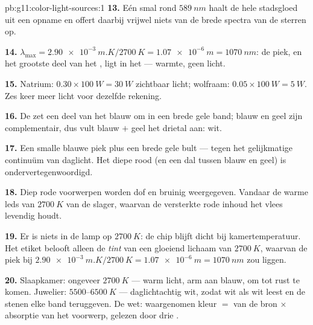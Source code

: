 \begin{solution}{pb:g11:color-light-sources:1}
\textbf{13.} Eén smal  rond $\qty{589}{nm}$ haalt de hele
stadsgloed uit een opname en offert daarbij vrijwel niets van de brede
spectra van de sterren op.

\textbf{14.} $\lambda_{\max} = \qty{2.90e-3}{m.K}/\qty{2700}{K} =
\qty{1.07e-6}{m} = \qty{1070}{nm}$: de piek, en het grootste deel van het
, ligt in het  --- warmte, geen licht.

\textbf{15.} Natrium: $0.30 \times \qty{100}{W} = \qty{30}{W}$ zichtbaar
licht; wolfraam: $0.05 \times \qty{100}{W} = \qty{5}{W}$. Zes keer meer
licht voor dezelfde rekening.

\textbf{16.} De  zet een deel van het blauw om in een brede gele
band; blauw en geel zijn complementair, dus vult blauw $+$ geel het
drietal aan: wit.

\textbf{17.} Een smalle blauwe piek plus een brede gele bult --- tegen
het gelijkmatige continuüm van daglicht. Het diepe rood (en een dal
tussen blauw en geel) is ondervertegenwoordigd.

\textbf{18.} Diep rode voorwerpen worden dof en bruinig weergegeven.
Vandaar de warme leds van $\qty{2700}{K}$ van de slager, waarvan de
versterkte rode inhoud het vlees levendig houdt.

\textbf{19.} Er is niets in de lamp op $\qty{2700}{K}$: de chip blijft
dicht bij kamertemperatuur. Het etiket belooft alleen de \emph{tint} van
een gloeiend lichaam van $\qty{2700}{K}$, waarvan de piek bij
$\qty{2.90e-3}{m.K}/\qty{2700}{K} = \qty{1.07e-6}{m} = \qty{1070}{nm}$
zou liggen.

\textbf{20.} Slaapkamer: ongeveer $\qty{2700}{K}$ --- warm licht, arm aan
blauw, om tot rust te komen. Juwelier: $5500$--$\qty{6500}{K}$ ---
daglichtachtig wit, zodat wit als wit leest en de stenen elke band
teruggeven. De wet: waargenomen kleur $=$  van de bron
$\times$ absorptie van het voorwerp, gelezen door drie .
\end{solution}

